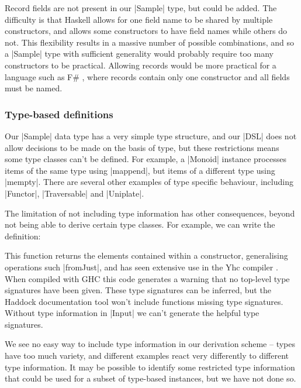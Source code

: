 \documentclass[preprint,draft]{sigplanconf}
\begin{document}
Record fields are not present in our |Sample| type, but could be added. The difficulty is that Haskell allows for one field name to be shared by multiple constructors, and allows some constructors to have field names while others do not. This flexibility results in a massive number of possible combinations, and so a |Sample| type with sufficient generality would probably require too many constructors to be practical. Allowing records would be more practical for a language such as F\# \cite{fsharp}, where records contain only one constructor and all fields must be named.

\subsubsection{Type-based definitions}
\label{sec:fromCtorName}

Our |Sample| data type has a very simple type structure, and our |DSL| does not allow decisions to be made on the basis of type, but these restrictions means some type classes can't be defined. For example, a |Monoid| instance processes items of the same type using |mappend|, but items of a different type using |mempty|. There are several other examples of type specific behaviour, including |Functor|, |Traversable| and |Uniplate|.

The limitation of not including type information has other consequences, beyond not being able to derive certain type classes. For example, we can write the definition:


This function returns the elements contained within a constructor, generalising operations such |fromJust|, and has seen extensive use in the Yhc compiler \cite{yhc}. When compiled with GHC this code generates a warning that no top-level type signatures have been given. These type signatures can be inferred, but the Haddock documentation tool \cite{haddock} won't include functions missing type signatures. Without type information in |Input| we can't generate the helpful type signatures.

We see no easy way to include type information in our derivation scheme -- types have too much variety, and different examples react very differently to different type information. It may be possible to identify some restricted type information that could be used for a subset of type-based instances, but we have not done so.
\end{document}
